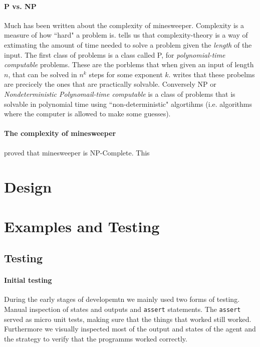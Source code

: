\documentclass[british]{article}
\newcommand{\code}[1]{\texttt{#1}}
\begin{document}
\paragraph{P vs. NP} Much has been written about the complexity of minesweeper. Complexity is a measure of how ``hard" a problem is. \cite{Kaye00} tells us that complexity-theory is a way of extimating the amount of time needed to solve a problem given the \textit{length} of the input. The first class of problems is a class called P, for \textit{polynomial-time computable} problems. These are the porblems that when given an input of length $n$, that can be solved in $n^k$ steps for some exponent $k$. \citeauthor{Kaye00} writes that these probelms are precicely the ones that are practically solvable. Conversely NP or \textit{Nondeterministic Polynomail-time computable} is a class of problems that is solvable in polynomial time using ``non-deterministic" algortihms (i.e. algorithms where the computer is allowed to make some guesses).  

\paragraph{The complexity of minesweeper} \cite{Kaye00} proved that minesweeper is NP-Complete. This 
 
\section{Design}
\label{design}


\section{Examples and Testing}
\label{sec:testing}
 
\subsection{Testing}
\label{subsec:testing}
\paragraph{Initial testing} During the early stages of developemtn we mainly used two forms of testing. Manual inspection of states and outputs and \code{assert} statements. The \code{assert} served as micro unit tests, making sure that the things that worked still worked. Furthermore we visually inspected most of the output and states of the agent and the strategy to verify that the programms worked correctly. 
\end{document}
